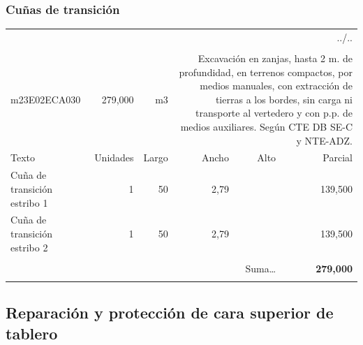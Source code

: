 \documentclass{book}%
\begin{document}
%
\subsubsection{Cuñas de transición}%
\begin{longtable}{lrrrrr}%
\multicolumn{6}{r}{../..}\\%
\endfoot%
\endlastfoot%
&&&&&\\%
m23E02ECA030&   279,000& m3&\multicolumn{3}{p{6cm}}{\scriptsize Excavación en zanjas, hasta 2 m. de profundidad, en terrenos compactos, por medios manuales, con extracción de tierras a los bordes, sin carga ni transporte al vertedero y con p.p. de medios auxiliares. Según CTE DB SE-C y NTE-ADZ.\normalsize}\\%
Texto&Unidades&Largo&Ancho&Alto&Parcial\\%
\hline%
\multicolumn{1}{p{3.5cm}}{Cuña de transición estribo 1}&1&50&2,79&&   139,500\\%
\multicolumn{1}{p{3.5cm}}{Cuña de transición estribo 2}&1&50&2,79&&   139,500\\%
&&&&&\\%
\multicolumn{5}{r}{Suma\ldots}&\textbf{   279,000}\\%
\hline%
&&&&&\\%
\end{longtable}%
\newpage

%
\subsection{Reparación y protección de cara superior de tablero}%
\end{document}
